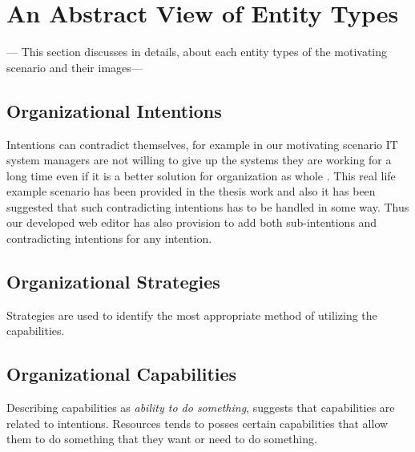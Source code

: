 \section{An Abstract View of Entity Types}
\label{sec:entities}
 --- This section discusses in details, about each entity types of the motivating scenario and 
 their images---
 

\subsection{Organizational Intentions} 
\label{sec:intentions}
Intentions can contradict themselves, for example in our motivating scenario IT system managers are not willing to give up the systems they are working for a long time even if it is a better solution for organization as whole . This real life example scenario has been provided in the thesis work \cite{Sierr2015} and also it has been suggested that such contradicting intentions has to be handled in some way. Thus our developed web editor has also provision to add both sub-intentions and contradicting intentions for any intention.  


\subsection{Organizational Strategies} 
\label{sec:strategies}
Strategies are used to identify the most appropriate method of utilizing the capabilities. 


\subsection{Organizational Capabilities}
\label{sec:capabilities}
Describing  capabilities as \textit{ability to do something}, suggests that capabilities are related to intentions. Resources tends to posses certain capabilities that allow them to do something that they want or need to do something. 



